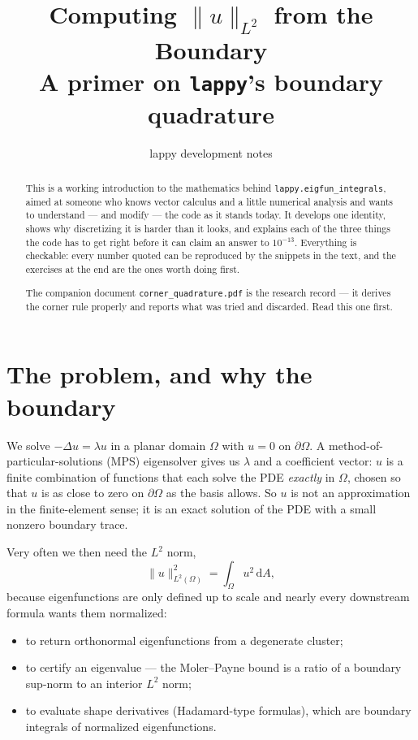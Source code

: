\documentclass[11pt]{article}
\title{Computing $\|u\|_{L^2}$ from the Boundary\\
\large A primer on \texttt{lappy}'s boundary quadrature}
\author{lappy development notes}
\date{}
\theoremstyle{definition}
\theoremstyle{remark}
\newcommand{\dd}{\,\mathrm{d}}
\newcommand{\Om}{\Omega}
\newcommand{\code}[1]{\texttt{#1}}
\begin{document}
\maketitle

\begin{abstract}
\noindent
This is a working introduction to the mathematics behind
\code{lappy.eigfun\_integrals}, aimed at someone who knows vector calculus and a
little numerical analysis and wants to understand --- and modify --- the code as
it stands today. It develops one identity, shows why discretizing it is harder
than it looks, and explains each of the three things the code has to get right
before it can claim an answer to $10^{-13}$. Everything is checkable: every
number quoted can be reproduced by the snippets in the text, and the exercises at
the end are the ones worth doing first.

\medskip\noindent
The companion document \code{corner\_quadrature.pdf} is the research record --- it
derives the corner rule properly and reports what was tried and discarded. Read
this one first.
\end{abstract}

\tableofcontents

\section{The problem, and why the boundary}

We solve $-\Delta u=\lambda u$ in a planar domain $\Om$ with $u=0$ on
$\partial\Om$. A method-of-particular-solutions (MPS) eigensolver gives us
$\lambda$ and a coefficient vector: $u$ is a finite combination of functions that
each solve the PDE \emph{exactly} in $\Om$, chosen so that $u$ is as close to
zero on $\partial\Om$ as the basis allows. So $u$ is not an approximation in the
finite-element sense; it is an exact solution of the PDE with a small nonzero
boundary trace.

Very often we then need the $L^2$ norm,
\begin{equation}
  \|u\|_{L^2(\Om)}^2 = \int_\Om u^2 \dd A,
\end{equation}
because eigenfunctions are only defined up to scale and nearly every downstream
formula wants them normalized:

\begin{itemize}
\item to return orthonormal eigenfunctions from a degenerate cluster;
\item to certify an eigenvalue --- the Moler--Payne bound is a ratio of a
      boundary sup-norm to an interior $L^2$ norm;
\item to evaluate shape derivatives (Hadamard-type formulas), which are boundary
      integrals of normalized eigenfunctions.
\end{itemize}
\end{document}
